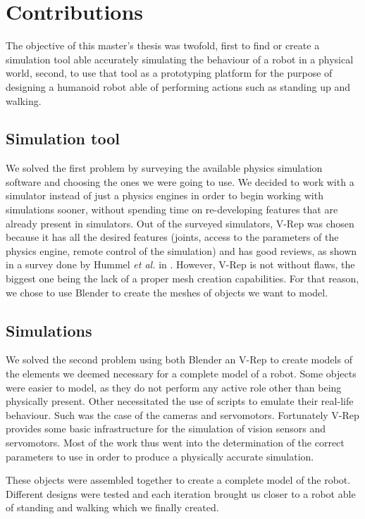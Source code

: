 \section{Contributions}
The objective of this master's thesis was twofold, first to find or create a simulation tool able accurately simulating the behaviour of a robot in a physical world, second, to use that tool as a prototyping platform for the purpose of designing a humanoid robot able of performing actions such as standing up and walking. 

\subsection{Simulation tool}
We solved the first problem by surveying the available physics simulation software and choosing the ones we were going to use. We decided to work with a simulator instead of just a physics engines in order to begin working with simulations sooner, without spending time on re-developing features that are already present in simulators. Out of the surveyed simulators, V-Rep was chosen because it has all the desired features (joints, access to the parameters of the physics engine, remote control of the simulation) and has good reviews, as shown in a survey done by Hummel \emph{et al.} in \cite{hummel2012evaluation}. However, V-Rep is not without flaws, the biggest one being the lack of a proper mesh creation capabilities. For that reason, we chose to use Blender to create the meshes of objects we want to model. 

\subsection{Simulations}
We solved the second problem using both Blender an V-Rep to create models of the elements we deemed necessary for a complete model of a robot. Some objects were easier to model, as they do not perform any active role other than being physically present. Other necessitated the use of scripts to emulate their real-life behaviour. Such was the case of the cameras and servomotors. Fortunately V-Rep provides some basic infrastructure for the simulation of vision sensors and servomotors. Most of the work thus went into the determination of the correct parameters to use in order to produce a physically accurate simulation.

These objects were assembled together to create a complete model of the robot. Different designs were tested and each iteration brought us closer to a robot able of standing and walking which we finally created. 

